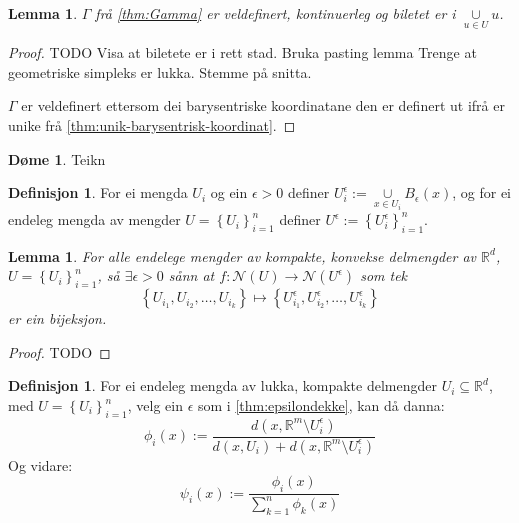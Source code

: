\documentclass[a4paper, titlepage, 12pt, norsk]{article}
\theoremstyle{plain}
\newtheorem{lemma}[theorem]{Lemma}
\theoremstyle{definition}
\newtheorem{definition}[theorem]{Definisjon}
\newtheorem{example}[theorem]{Døme}
\newcommand{\Rb}{\mathbb{R}}
\newcommand{\Nc}{\mathcal{N}}
\newcommand{\union}{ \mathop{\cup}\limits }
\newcommand{\set}[1]{ \left \{ #1 \right \} } %
\begin{document}
\begin{lemma} %
	\( \Gamma \) frå \autoref{thm:Gamma} er veldefinert, kontinuerleg og biletet er i \( \union_{u\in U} u \).
\end{lemma}

\begin{proof}
	TODO
	Visa at biletete er i rett stad.
	Bruka pasting lemma
	Trenge at geometriske simpleks er lukka.
	Stemme på snitta.

	\( \Gamma \) er veldefinert ettersom dei barysentriske koordinatane den er definert ut ifrå er unike frå \autoref{thm:unik-barysentrisk-koordinat}.

	
\end{proof}

\begin{example}
	Teikn
\end{example}

\begin{definition} %
	For ei mengda \( U_i \) og ein \( \epsilon > 0 \) definer \( U_i^\epsilon := \union_{x \in U_i} B_\epsilon(x) \), og for ei endeleg mengda av mengder \( U=\set{U_i}_{i=1}^n \) definer \( U^\epsilon := \set{U_i^\epsilon}_{i=1}^n \).
\end{definition}

\begin{lemma} \label{thm:epsilondekke} %
	For alle endelege mengder av kompakte, konvekse delmengder av \( \Rb^d \), \( U = \set{U_i}_{i=1}^n \), så \( \exists \epsilon > 0 \) sånn at \(f: \Nc(U) \to \Nc(U^\epsilon) \) som tek 
	\[ 
		\set{U_{i_1}, U_{i_2}, \dots, U_{i_k}} \mapsto \set{U_{i_1}^\epsilon, U_{i_2}^\epsilon, \dots, U_{i_k}^\epsilon} 
	\] 
	er ein bijeksjon.
\end{lemma}

\begin{proof}
	TODO
\end{proof}

\begin{definition} \label{thm:psi} %
	For ei endeleg mengda av lukka, kompakte delmengder \( U_i \subseteq \Rb^d \), med \( U = \set{U_i}_{i=1}^n \), velg ein \( \epsilon \) som i \autoref{thm:epsilondekke}, kan då danna:
	\[
		\phi_i(x) := \frac{d(x, \Rb^m \setminus U_i^\epsilon)}{d(x, U_i) + d(x, \Rb^m \setminus U_i^\epsilon)}
	\]
	Og vidare:
	\[
		\psi_i(x) := \frac{\phi_i(x)}{\sum_{k=1}^n \phi_k(x)}
	\]
\end{definition}
\end{document}

